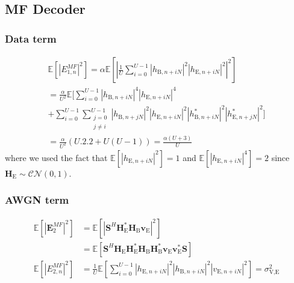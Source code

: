 \documentclass[journal,comsoc]{IEEEtran}
\newcommand{\module}[1]{\left|#1\right|}
\newcommand{\EX}[1]{\mathbb{E} \left[#1\right]}%
\newcommand{\HE}{\textbf{H}_{\text{E}}}
\newcommand{\HB}{\textbf{H}_{\text{B}}}
\newcommand{\ve}{\textbf{v}_{\text{E}}}
\newcommand{\spread}{\textbf{S}}
\begin{document}
\subsection{MF Decoder}\label{sec:matched-filtering-app}
\subsubsection{Data term}\label{sec:data-term-app-2}
\begin{multline}
	\EX{|E_{1,n}^{MF}|^2} = \alpha \EX{\left|\frac{1}{U}\sum_{i=0}^{U-1} \left| h_{\text{B}, n + iN}\right|^2 \left| h_{\text{E}, n + iN}\right|^2\right|^2} \\
	=\frac{\alpha}{U^2} \mathbb{E} \Bigg[\sum_{i=0}^{U-1} \left| h_{\text{B}, n + iN}\right|^4 \left| h_{\text{E}, n + iN}\right|^4 \\
	+ \sum_{i=0}^{U-1}\sum_{\substack{j=0 \\ j\neq i}}^{U-1}  \left| h_{\text{B}, n + jN}\right|^2 \left| h_{\text{E}, n + iN}\right|^2 \left| h^*_{\text{B}, n + iN}\right|^2 \left| h^*_{\text{E}, n + jN}\right|^2 \Bigg] \\
	= \frac{\alpha}{U^2} \left(U.2.2 + U(U-1) \right) = \frac{\alpha (U+3)}{U}
	\label{eq:data_eve_filt1-app}
\end{multline}
where we used the fact that $\EX{\left| h_{\text{E}, n + iN}\right|^2} = 1$ and $\EX{\left| h_{\text{E}, n + iN}\right|^4} = 2$ since $\HE \sim \mathcal{CN}(0,1)$.



\subsubsection{AWGN term}\label{sec:awgn-term-app-2}
\begin{equation}
	\begin{split}
		\EX{|\textbf{E}_{2}^{MF}|^2} &=  \EX{\module{\spread^H \HE^* \HB \ve}^2} \\
		&=\EX{\spread^H   \HE \HE^* \HB\HB^*  \ve \ve^* \spread } \\
		\EX{|E_{2,n}^{MF}|^2} &= \frac{1}{U} \EX{\sum_{i=0}^{U-1} |h_{\text{E}, n + iN}|^2 |h_{\text{B}, n + iN}|^2 |v_{\text{E}, n + iN}|^2} = \sigma^2_{\text{V,E}}
	\end{split}
	\label{eq:noise_eve_filt1-app}
\end{equation}
\end{document}
